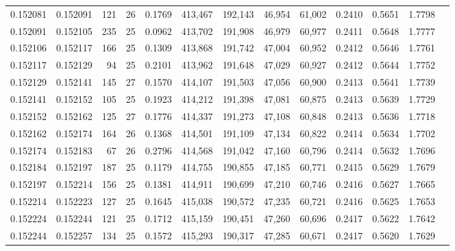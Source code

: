 \begin{tabular}{rrrrrrrrrrrrr}
0.152081 & 0.152091 & 121 &  26 &                                     0.1769 & 413,467 & 192,143 &  46,954 &  61,002 & 0.2410 & 0.5651 & 1.7798 \\
0.152091 & 0.152105 & 235 &  25 &                                     0.0962 & 413,702 & 191,908 &  46,979 &  60,977 & 0.2411 & 0.5648 & 1.7777 \\
0.152106 & 0.152117 & 166 &  25 &                                     0.1309 & 413,868 & 191,742 &  47,004 &  60,952 & 0.2412 & 0.5646 & 1.7761 \\
0.152117 & 0.152129 &  94 &  25 &                                     0.2101 & 413,962 & 191,648 &  47,029 &  60,927 & 0.2412 & 0.5644 & 1.7752 \\
0.152129 & 0.152141 & 145 &  27 &                                     0.1570 & 414,107 & 191,503 &  47,056 &  60,900 & 0.2413 & 0.5641 & 1.7739 \\
0.152141 & 0.152152 & 105 &  25 &                                     0.1923 & 414,212 & 191,398 &  47,081 &  60,875 & 0.2413 & 0.5639 & 1.7729 \\
0.152152 & 0.152162 & 125 &  27 &                                     0.1776 & 414,337 & 191,273 &  47,108 &  60,848 & 0.2413 & 0.5636 & 1.7718 \\
0.152162 & 0.152174 & 164 &  26 &                                     0.1368 & 414,501 & 191,109 &  47,134 &  60,822 & 0.2414 & 0.5634 & 1.7702 \\
0.152174 & 0.152183 &  67 &  26 &                                     0.2796 & 414,568 & 191,042 &  47,160 &  60,796 & 0.2414 & 0.5632 & 1.7696 \\
0.152184 & 0.152197 & 187 &  25 &                                     0.1179 & 414,755 & 190,855 &  47,185 &  60,771 & 0.2415 & 0.5629 & 1.7679 \\
0.152197 & 0.152214 & 156 &  25 &                                     0.1381 & 414,911 & 190,699 &  47,210 &  60,746 & 0.2416 & 0.5627 & 1.7665 \\
0.152214 & 0.152223 & 127 &  25 &                                     0.1645 & 415,038 & 190,572 &  47,235 &  60,721 & 0.2416 & 0.5625 & 1.7653 \\
0.152224 & 0.152244 & 121 &  25 &                                     0.1712 & 415,159 & 190,451 &  47,260 &  60,696 & 0.2417 & 0.5622 & 1.7642 \\
0.152244 & 0.152257 & 134 &  25 &                                     0.1572 & 415,293 & 190,317 &  47,285 &  60,671 & 0.2417 & 0.5620 & 1.7629 \\

\end{tabular}
